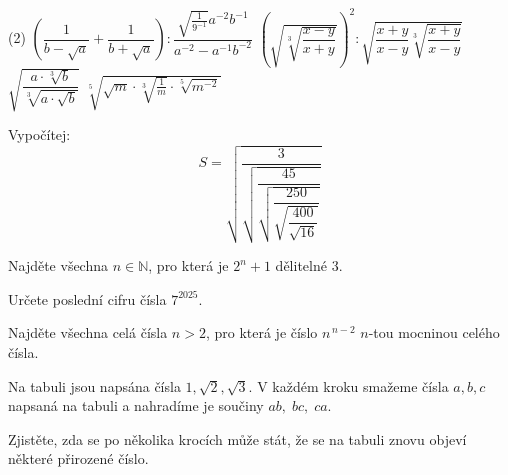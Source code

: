 \documentclass[12pt,a4paper]{article}
\begin{document}
\begin{exercise}[Zjednodušte]
    \begin{tasks}(2)
        \task $\left(\dfrac{1}{b-\sqrt{a}} + \dfrac{1}{b+\sqrt{a}}\right) : \dfrac{\sqrt{\frac{1}{9^{-1}}}a^{-2}b^{-1}}{a^{-2}-a^{-1}b^{-2}}$
        \task $\left(\sqrt{\sqrt[3]{\dfrac{x-y}{x+y}}}\right)^2 : \sqrt{\dfrac{x+y}{x-y}\sqrt[3]{\dfrac{x+y}{x-y}}}$
        \task $\sqrt{\dfrac{a \cdot \sqrt[3]{b}}{\sqrt[3]{a \cdot \sqrt{b}}}}$
        \task $\sqrt[5]{\sqrt{m} \cdot \sqrt[3]{\frac{1}{m}} \cdot \sqrt[5]{m^{-2}}}$
    \end{tasks}
\end{exercise}


\newpage
\setcounter{section}{10}
\begin{exercise}
    Vypočítej:
    \[
    S=\sqrt{\dfrac{3}{\sqrt{\dfrac{45}{\sqrt{\dfrac{250}{\sqrt{\dfrac{400}{\sqrt{16}}}}}}}}}
    \]
\end{exercise}


\begin{exercise}
Najděte všechna $n \in \mathbb{N}$, pro která je $2^{n}+1$ dělitelné $3$.
\end{exercise}


\begin{exercise}
Určete poslední cifru čísla $7^{2025}$.
\end{exercise}


\begin{exercise}
Najděte všechna celá čísla \(n>2\), pro která je číslo \(n^{\,n-2}\) \(n\)-tou mocninou celého čísla.
\end{exercise}


\begin{exercise}
Na tabuli jsou napsána čísla $1, \sqrt{2}, \sqrt{3}$.  
V každém kroku smažeme čísla $a, b, c$ napsaná na tabuli a nahradíme je součiny $ab, \; bc, \; ca$.  

Zjistěte, zda se po několika krocích může stát, že se na tabuli znovu objeví některé přirozené číslo.
\end{exercise}
\end{document}
